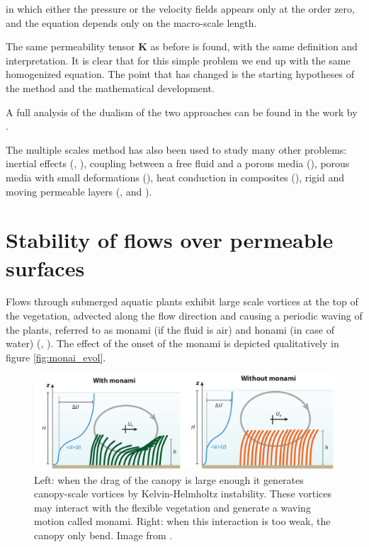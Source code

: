 \noindent in which either the pressure or the velocity fields appears only at the order zero, and the equation depends only on the macro-scale length.

The same permeability tensor $\mathbf{K}$ as before is found, with the same definition and interpretation.
It is clear that for this simple problem we end up with the same homogenized equation. The point that has changed is the starting hypotheses of the method and the mathematical development.

A full analysis of the dualism of the two approaches can be found in the work by \citet{davit2013homogenization}.

The multiple scales method has also been used to study many other problems: inertial effects (\citet{mei1991effect}, \citet{skjetne1999new}), coupling between a free fluid and a porous media (\citet{mikelic2000interface}), porous media with small deformations (\citet{auriault1977etude}), heat conduction in composites (\citet{auriault1983effective}), rigid and moving permeable layers (\citet{zampogna2016fluid}, \citet{ugis} and \citet{zampogna2017pelskin}).



\section{Stability of flows over permeable surfaces}
\label{sec:stability}

Flows through submerged aquatic plants exhibit large scale vortices at the top of the vegetation,
advected along the flow direction and causing a periodic waving of the plants, referred to as
monami (if the fluid is air) and honami (in case of water) (\citet{inoue1955studies}, \citet{ackerman1993reduced}).
The effect of the onset of the monami is depicted qualitatively in figure \ref{fig:monai_evol}.

\begin{figure}[h]
	\centering
	\includegraphics[width=1\linewidth]{chapter_1/monami}
	\caption{Left: when the drag of the canopy is large enough it generates canopy-scale vortices by Kelvin-Helmholtz instability. These vortices may interact with the flexible vegetation and generate a waving motion called monami. Right: when this interaction is too weak, the canopy only bend. Image from \citet{nepf2012flow}.}
	\label{fig:monami}
\end{figure}

